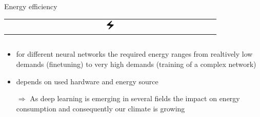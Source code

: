 \documentclass[compress,aspectratio=169]{beamer}
\begin{document}
\begin{frame}{Energy efficiency 
              \begin{tabular}{@{}c@{}}
                  \includegraphics[width=0.05\textwidth]{assets/electric_bolt_FILL0_wght400_GRAD0_opsz48}
              \end{tabular}
              }



    \begin{columns}
        
        \begin{column}{0.6\textwidth}
            \begin{itemize}
                \item for different neural networks the required energy ranges from realtively low demands (finetuning) to very high demands (training of a complex network)
                \item depends on used hardware and energy source
                \item[$\Rightarrow$] As deep learning is emerging in several fields the impact on energy consumption and consequently our climate is growing
            \end{itemize}


            
        \end{column}


\end{columns}
\end{frame}
\end{document}
